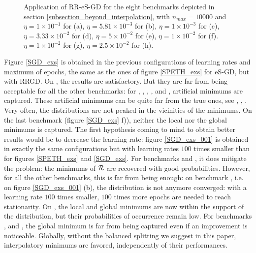 \documentclass[article,authoryear,jmlmc]{beg_32}             %
\begin{document}
\begin{figure}[h!]
	\centering
	\scalebox{0.60}{}
        \caption{
          Application of RR-eS-GD for the eight benchmarks depicted in section \ref{subsection_beyond_interpolation}, with $n_{max}=10000$ and
 $\eta = 1   \times 10^{-1}$  for \exOne    (a),
 $\eta = 5.81\times 10^{-3}$  for \exTwo    (b),
 $\eta = 1   \times 10^{-3}$  for \exThree  (c),
 $\eta = 3.33\times 10^{-2}$  for \exFour   (d),
 $\eta = 5   \times 10^{-2}$  for \exFive   (e),
 $\eta = 1   \times 10^{-2}$  for \exSix    (f).
 $\eta = 1   \times 10^{-2}$  for \exSeven  (g),
 $\eta = 2.5 \times 10^{-2}$  for \exHeight (h).
}
	\label{RR_SPETH_exs}
\end{figure}



Figure \ref{SGD_exs} is obtained in the previous configurations of learning rates and maximum of epochs, the same as the ones of figure \ref{SPETH_exs} for eS-GD, but with RRGD. 
On \exTwo, the results are satisfactory. But they are far from being acceptable for all the other benchmarks: for \exOne, \exThree, \exFour, \exFive, \exSeven and \exHeight,
artificial minimums are captured. These artificial minimums can be quite far from the true ones, see \exFour, \exSeven, \exHeight.    
Very often, the distributions are not peaked in the vicinities of the minimums.
On the last benchmark (figure \ref{SGD_exs} f)), neither the local nor the global minimums is captured. 
The first hypothesis coming to mind to obtain better results would be to decrease the learning rate: figure \ref{SGD_exs_001} is obtained in exactly the same configurations but
with learning rates $100$ times smaller than for figures \ref{SPETH_exs} and \ref{SGD_exs}. 
For benchmarks \exOne and \exFour, it does mitigate the problem: the minimums of $\mathcal{R}$ are recovered with good probabilities. 
However, for all the other benchmarks, this is far from being enough: on benchmark \exTwo, i.e. on figure \ref{SGD_exs_001} (b), the distribution is not anymore
converged: with a  learning rate $100$ times smaller, $100$ times more epochs are needed to reach stationarity.
On \exThree, the local and global minimums are now within the support of the distribution, but their probabilities of occurrence remain low.
For benchmarks \exFive, \exSeven and \exHeight, the global minimum is far from being captured even if an improvement is noticeable. 
Globally, without the balanced splitting we suggest in this paper, interpolatory minimums are favored, independently of their performances.  
\end{document}
